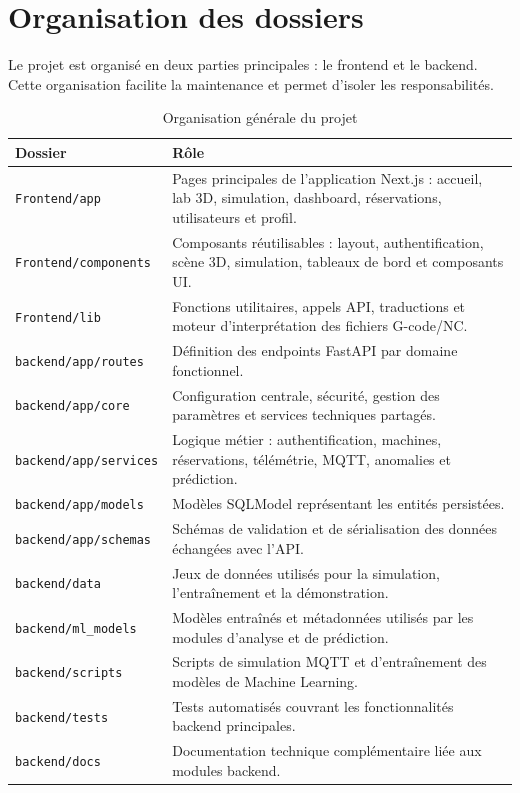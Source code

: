 \section{Organisation des dossiers}

Le projet est organisé en deux parties principales : le frontend et le backend. Cette organisation facilite la maintenance et permet d’isoler les responsabilités.

\begin{table}[H]
\centering
\small
\caption{Organisation générale du projet}
\label{tab:organisation-projet}
\begin{tabular}{|p{}|p{}|}
\hline
\rowcolor{SectionColor!12}
\textbf{Dossier} & \textbf{Rôle} \\
\hline
\texttt{Frontend/app} & Pages principales de l’application Next.js : accueil, lab 3D, simulation, dashboard, réservations, utilisateurs et profil. \\
\hline
\texttt{Frontend/components} & Composants réutilisables : layout, authentification, scène 3D, simulation, tableaux de bord et composants UI. \\
\hline
\texttt{Frontend/lib} & Fonctions utilitaires, appels API, traductions et moteur d’interprétation des fichiers G-code/NC. \\
\hline
\texttt{backend/app/routes} & Définition des endpoints FastAPI par domaine fonctionnel. \\
\hline
\texttt{backend/app/core} & Configuration centrale, sécurité, gestion des paramètres et services techniques partagés. \\
\hline
\texttt{backend/app/services} & Logique métier : authentification, machines, réservations, télémétrie, MQTT, anomalies et prédiction. \\
\hline
\texttt{backend/app/models} & Modèles SQLModel représentant les entités persistées. \\
\hline
\texttt{backend/app/schemas} & Schémas de validation et de sérialisation des données échangées avec l’API. \\
\hline
\texttt{backend/data} & Jeux de données utilisés pour la simulation, l’entraînement et la démonstration. \\
\hline
\texttt{backend/ml\_models} & Modèles entraînés et métadonnées utilisés par les modules d’analyse et de prédiction. \\
\hline
\texttt{backend/scripts} & Scripts de simulation MQTT et d’entraînement des modèles de Machine Learning. \\
\hline
\texttt{backend/tests} & Tests automatisés couvrant les fonctionnalités backend principales. \\
\hline
\texttt{backend/docs} & Documentation technique complémentaire liée aux modules backend. \\
\hline
\end{tabular}
\end{table}

